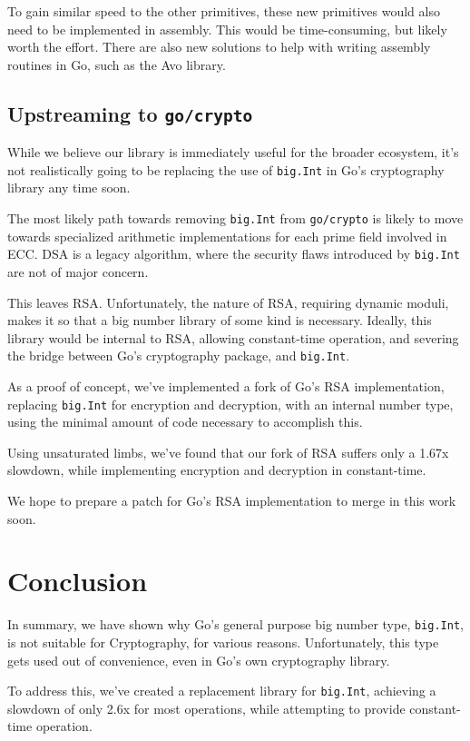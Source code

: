\documentclass[11pt, a4paper]{article} %
\begin{document}
{To gain similar speed to the other primitives, these new primitives
would also need to be implemented in assembly. This would be time-consuming,
but likely worth the effort. There are also new solutions
to help with writing assembly routines in Go, such as the Avo library.

\subsection{Upstreaming to \texttt{go/crypto}}

While we believe our library is immediately useful for the broader
ecosystem, it's not realistically going to be replacing
the use of \texttt{big.Int} in Go's cryptography library any time soon.

The most likely path towards removing \texttt{big.Int} from
\texttt{go/crypto} is likely to move towards specialized arithmetic
implementations for each prime field involved in ECC. DSA is a legacy
algorithm, where the security flaws introduced
by \texttt{big.Int} are not of major concern.

This leaves RSA. Unfortunately, the nature of RSA, requiring dynamic
moduli, makes it so that a big number library of some kind is necessary.
Ideally, this library would be internal to RSA, allowing constant-time
operation, and severing the bridge between Go's cryptography
package, and \texttt{big.Int}.

As a proof of concept, we've implemented a fork of Go's RSA implementation,
replacing \texttt{big.Int} for encryption and decryption, 
with an internal number type, using the minimal amount of code
necessary to accomplish this.

Using unsaturated limbs, we've found that our fork of RSA
suffers only a 1.67x slowdown, while implementing encryption and
decryption in constant-time.

We hope to prepare a patch for Go's RSA implementation to merge
in this work soon.

\section{Conclusion}

In summary, we have shown
why Go's general purpose big number type, \texttt{big.Int},
is not suitable for Cryptography, for various reasons.
Unfortunately, this type gets used out of convenience,
even in Go's own cryptography library.

To address this, we've created a replacement library for \texttt{big.Int},
achieving a slowdown of only 2.6x for most operations, while attempting
to provide constant-time operation.

}
\end{document}
